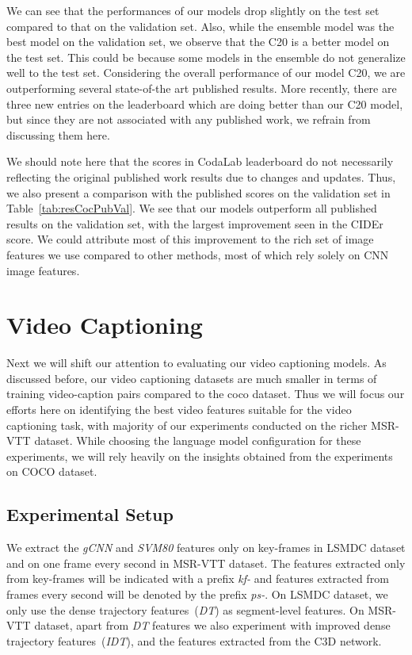 We can see that the performances of our models drop slightly on the test set
compared to that on the validation set. 
Also, while the ensemble model was the best model on the validation set, we
observe that the C20 is a better model on the test set.
This could be because some models in the ensemble do not generalize well to the
test set.
Considering the overall performance of our model C20, we are outperforming
several state-of-the art published results.
More recently, there are three new entries on the leaderboard which are doing
better than our C20 model, but since they are not associated with any published
work, we refrain from discussing them here.

We should note here that the scores in CodaLab leaderboard do not necessarily
reflecting the original published work results due to changes and updates.
Thus, we also present a comparison with the published scores on the validation
set in Table~\ref{tab:resCocPubVal}.
We see that our models outperform all published results on the validation set,
with the largest improvement seen in the CIDEr score.
We could attribute most of this improvement to the rich set of image features we
use compared to other methods, most of which rely solely on CNN image features.

\section{Video Captioning}
Next we will shift our attention to evaluating our video captioning models.
As discussed before, our video captioning datasets are much smaller in terms of
training video-caption pairs compared to the coco dataset.
Thus we will focus our efforts here on identifying the best video features
suitable for the video captioning task, with majority of our experiments
conducted on the richer MSR-VTT dataset.
While choosing the language model configuration for these experiments, we will
rely heavily on the insights obtained from the experiments on COCO dataset.

\subsection{Experimental Setup}
We extract the \emph{gCNN} and \emph{SVM80} features only on key-frames in LSMDC
dataset and on one frame every second in MSR-VTT dataset.
The features extracted only from key-frames will be indicated with a prefix
\emph{kf-} and features extracted from frames every second will be denoted by
the prefix \emph{ps-}.
On LSMDC dataset, we only use the dense trajectory features~(\emph{DT}) as
segment-level features.
On MSR-VTT dataset, apart from \emph{DT} features we also experiment with
improved dense trajectory features~(\emph{IDT}), and the features extracted from
the C3D network.

